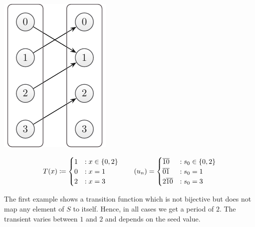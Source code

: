 \documentclass{stdlocal}
\begin{document}
  \medskip
  \begin{minipage}{0.2\textwidth}
    \includegraphics[width=\textwidth]{figures/periodicity_example_a.pdf}
  \end{minipage}
  \hfill
  \begin{minipage}{0.73\textwidth}
    \[
      T(x) \define
      \begin{cases}
        1 &: x \in \set{0,2}{} \\
        0 &: x = 1 \\
        2 &: x = 3
      \end{cases}
      \separate
      (u_n) =
      \begin{cases}
        \overline{10} &: s_0 \in \set{0,2}{} \\
        \overline{01} &: s_0 = 1 \\
        2\overline{10} &: s_0 = 3
      \end{cases}
    \]
  \end{minipage}
  \medskip
  \par
  \noindent
  The first example shows a transition function which is not bijective but does not map any element of $S$ to itself.
  Hence, in all cases we get a period of $2$.
  The transient varies between $1$ and $2$ and depends on the seed value.
\end{document}
